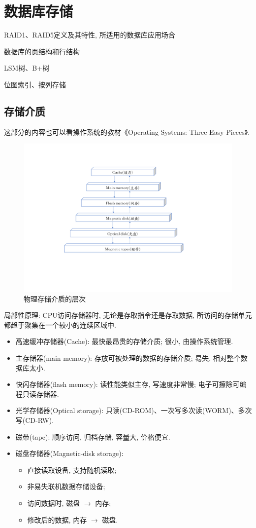 \chapter{数据库存储}

\begin{introduction}[期末考试提纲]
    \item RAID1、RAID5定义及其特性, 所适用的数据库应用场合
    \item 数据库的页结构和行结构
    \item LSM树、B+树
    \item 位图索引、按列存储
\end{introduction}

\section{存储介质}

这部分的内容也可以看操作系统的教材《Operating Systems: Three Easy Pieces》\cite{ArpaciDusseau23-Book}.

\begin{figure}[H]
    \centering
    \includegraphics[width=.65\textwidth]{./figure/存储介质层次.pdf}
    \caption{物理存储介质的层次}
\end{figure}

局部性原理: CPU访问存储器时, 无论是存取指令还是存取数据, 所访问的存储单元都趋于聚集在一个较小的连续区域中.

\begin{itemize}
    \item 高速缓冲存储器(Cache): 最快最昂贵的存储介质; 很小, 由操作系统管理.
    \item 主存储器(main memory): 存放可被处理的数据的存储介质; 易失, 相对整个数据库太小.
    \item 快闪存储器(flash memory): 读性能类似主存, 写速度非常慢; 电子可擦除可编程只读存储器.
    \item 光学存储器(Optical storage): 只读(CD-ROM)、一次写多次读(WORM)、多次写(CD-RW).
    \item 磁带(tape): 顺序访问, 归档存储, 容量大, 价格便宜.
    \item 磁盘存储器(Magnetic-disk storage):
    \begin{itemize}
        \item 直接读取设备, 支持随机读取;
        \item 非易失联机数据存储设备;
        \item 访问数据时, 磁盘 $\to$ 内存;
        \item 修改后的数据, 内存 $\to$ 磁盘.
    \end{itemize}
\end{itemize}

